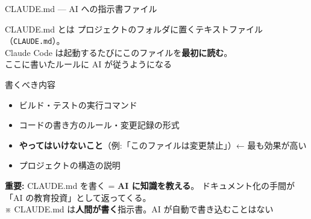 \documentclass[aspectratio=169, 14pt]{beamer}
\newcommand{\warn}[1]{\textcolor{sfred}{\textbf{#1}}}
\begin{document}
\begin{frame}{CLAUDE.md — AI への指示書ファイル}
  \begin{block}{CLAUDE.md とは}
    {\small プロジェクトのフォルダに置くテキストファイル（\texttt{CLAUDE.md}）。\\
    Claude Code は起動するたびにこのファイルを\textbf{最初に読む}。\\
    ここに書いたルールに AI が従うようになる}
  \end{block}

  \vspace{0.2em}

  \begin{alertblock}{書くべき内容}
    \begin{itemize}\footnotesize
      \item ビルド・テストの実行コマンド
      \item コードの書き方のルール・変更記録の形式
      \item \warn{やってはいけないこと}（例:「このファイルは変更禁止」）← 最も効果が高い
      \item プロジェクトの構造の説明
    \end{itemize}
  \end{alertblock}

  {\scriptsize \textbf{重要:} CLAUDE.md を書く = \textbf{AI に知識を教える}。
    ドキュメント化の手間が「AI の教育投資」として返ってくる。\\
    ※ CLAUDE.md は\textbf{人間が書く}指示書。AI が自動で書き込むことはない}
\end{frame}
\end{document}
